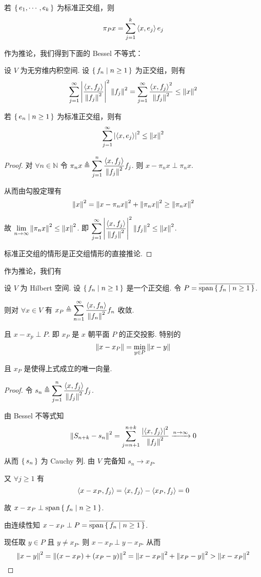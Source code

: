 \begin{hint}
    若 $\set{e_1,\cdots,e_k}$ 为标准正交组，则
$$
\pi_Px=\sum_{j=1}^k\left\langle{x,e_j}\right\rangle e_j
$$
\end{hint}

作为推论，我们得到下面的 Bessel 不等式：

\begin{property}
    设 $V$ 为无穷维内积空间. 设 $\set{f_n|n\ge 1}$ 为正交组，则有
$$
\sum_{j=1}^\infty\left\lvert{\frac{\left\langle{x,f_j}\right\rangle}{\left\lVert{f_j}\right\rVert^2}}\right\rvert^2\left\lVert{f_j}\right\rVert^2=\sum_{j=1}^\infty\frac{\left\langle{x,f_j}\right\rangle^2}{\left\lVert{f_j}\right\rVert^2}\le\left\lVert{x}\right\rVert^2
$$

    若 $\set{e_n|n\ge 1}$ 为标准正交组，则有
$$
\sum_{j=1}^\infty\left\lvert{\left\langle{x,e_j}\right\rangle}\right\rvert^2\le\left\lVert{x}\right\rVert^2
$$
\end{property}
\begin{proof}
    对 $\forall n\in\mathbb{N}$ 令 $\pi_nx\triangleq\displaystyle\sum_{j=1}^n\frac{\left\langle{x,f_j}\right\rangle}{\left\lVert{f_j}\right\rVert^2}f_j$. 则 $x-\pi_nx\perp\pi_nx$.

    从而由勾股定理有
$$
\left\lVert{x}\right\rVert^2=\left\lVert{x-\pi_nx}\right\rVert^2+\left\lVert{\pi_nx}\right\rVert^2\ge\left\lVert{\pi_nx}\right\rVert^2
$$

    故 $\lim\limits_{n\to\infty}\left\lVert{\pi_nx}\right\rVert^2\le\left\lVert{x}\right\rVert^2$. 即 $\displaystyle\sum_{j=1}^\infty\left\lvert{\frac{\left\langle{x,f_j}\right\rangle}{\left\lVert{f_j}\right\rVert^2}}\right\rvert^2\left\lVert{f_j}\right\rVert^2\le\left\lVert{x}\right\rVert^2$.

    标准正交组的情形是正交组情形的直接推论.
\end{proof}

作为推论，我们有

\begin{inference}
    设 $V$ 为 Hilbert 空间. 设 $\set{f_n|n\ge 1}$ 是一个正交组. 令 $P=\overline{\mathrm{span}\set{f_n|n\ge 1}}$.

    则对 $\forall x\in V$ 有 $x_P\triangleq\displaystyle\sum_{n=1}^\infty\frac{\left\langle{x,f_n}\right\rangle}{\left\lVert{f_n}\right\rVert^2}f_n$ 收敛.

    且 $x-x_p\perp P$. 即 $x_P$ 是 $x$ 朝平面 $P$ 的正交投影. 特别的
$$
\left\lVert{x-x_P}\right\rVert=\min_{y\in P}\left\lVert{x-y}\right\rVert
$$

    且 $x_P$ 是使得上式成立的唯一向量.
\end{inference}
\begin{proof}
    令 $s_n\triangleq\displaystyle\sum_{j=1}^n\frac{\left\langle{x,f_j}\right\rangle}{\left\lVert{f_j}\right\rVert^2}f_j$.

    由 Bessel 不等式知
$$
\left\lVert{S_{n+k}-s_n}\right\rVert^2=\sum_{j=n+1}^{n+k}\frac{\left\lvert{\left\langle{x,f_j}\right\rangle}\right\rvert^2}{\left\lVert{f_j}\right\rVert^2}\xrightarrow{n\to\infty}0
$$

    从而 $\set{s_n}$ 为 Cauchy 列. 由 $V$ 完备知 $s_n\to x_P$.

    又 $\forall j\ge 1$ 有
$$
\left\langle{x-x_P,f_j}\right\rangle=\left\langle{x,f_j}\right\rangle-\left\langle{x_P,f_j}\right\rangle=0
$$

    故 $x-x_P\perp\mathrm{span}\set{f_n|n\ge 1}$.

    由连续性知 $x-x_P\perp P=\overline{\mathrm{span}\set{f_n|n\ge 1}}$.

    现任取 $y\in P$ 且 $y\ne x_P$. 则 $x-x_P\perp y-x_P$. 从而
$$
\left\lVert{x-y}\right\rVert^2=\left\lVert{(x-x_P)+(x_P-y)}\right\rVert^2=\left\lVert{x-x_P}\right\rVert^2+\left\lVert{x_P-y}\right\rVert^2>\left\lVert{x-x_P}\right\rVert^2
$$
\end{proof}

